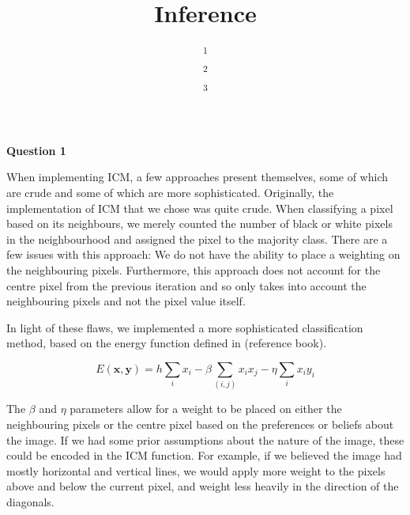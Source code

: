 \documentclass[10pt, a4paper, twocolumn]{article} %
\title{Inference} %
\author{
	\authorstyle{James O'Reilly\textsuperscript{1},  Adam Pluck\textsuperscript{2} and Jake Witter\textsuperscript{3}} %
	\newline\newline %
	\textsuperscript{1}\institution{candidate number (35055)}\\ %
	\textsuperscript{2}\institution{candidate number (5 digits)}\\ %
	\textsuperscript{3}\institution{35445}
}
\date{} %
\begin{document}
\maketitle %

\thispagestyle{firstpage} %



\textbf{Question 1}

When implementing ICM, a few approaches present themselves, some of which are crude and some of which are more sophisticated. Originally, the implementation of ICM that we chose was quite crude. When classifying a pixel based on its neighbours, we merely counted the number of black or white pixels in the neighbourhood and assigned the pixel to the majority class. There are a few issues with this approach: We do not have the ability to place a weighting on the neighbouring pixels. Furthermore, this approach does not account for the centre pixel from the previous iteration and so only takes into account the neighbouring pixels and not the pixel value itself.

In light of these flaws, we implemented a more sophisticated classification method, based on the energy function defined in (reference book).

\begin{equation}
    E(\mathbf{x}, \mathbf{y}) = h\sum_{i}x_i - \beta \sum_{(i,j)}x_i x_j - \eta \sum_{i}x_i y_i
\end{equation}

The $\beta$ and $\eta$ parameters allow for a weight to be placed on either the neighbouring pixels or the centre pixel based on the preferences or beliefs about the image. If we had some prior assumptions about the nature of the image, these could be encoded in the ICM function. For example, if we believed the image had mostly horizontal and vertical lines, we would apply more weight to the pixels above and below the current pixel, and weight less heavily in the direction of the diagonals.
\end{document}
